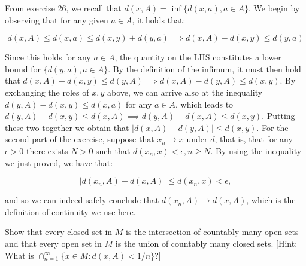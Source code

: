 \begin{solution}
    
    From exercise 26, we recall that $d(x, A) = \inf \{d(x, a), a \in A \}$.
    We begin by observing that for any given $a \in A$, it holds that:

    $$d(x, A) \leq d(x, a) \leq d(x, y) + d(y, a) \implies d(x, A) - d(x, y) \leq d(y, a)$$

    Since this holds for any $a \in A$, the quantity on the LHS constitutes a lower bound for $\{d(y, a), a \in A\}$.
    By the definition of the infimum, it must then hold that $d(x, A) - d(x, y) \leq d(y, A) \implies d(x, A) - d(y, A) \leq d(x, y)$.
    By exchanging the roles of $x, y$ above, we can arrive also at the inequality $d(y, A) - d(x, y) \leq d(x, a)$ for any $a \in A$, which leads to $d(y, A) - d(x, y) \leq d(x, A) \implies d(y, A) - d(x, A) \leq d(x, y)$.
    Putting these two together we obtain that $\lvert d(x, A) - d(y, A) \rvert \leq d(x, y)$.
    For the second part of the exercise, suppose that $x_n \rightarrow x$ under $d$, that is, that for any $\epsilon > 0$ there exists $N > 0$ such that $d(x_n, x) < \epsilon, n \geq N$.
    By using the inequality we just proved, we have that:

    $$\lvert d(x_n, A) - d(x, A) \rvert \leq d(x_n, x) < \epsilon,$$

    and so we can indeed safely conclude that $d(x_n, A) \rightarrow d(x, A)$, which is the definition of continuity we use here.
\end{solution}

\begin{exercise}{29}
    Show that every closed set in $M$ is the intersection of countably many open sets and that every open set in $M$ is the union of countably many closed sets.
    [Hint: What is $\cap_{n=1}^{\infty} \{x \in M : d(x, A) < 1/n\}$?]
\end{exercise}

